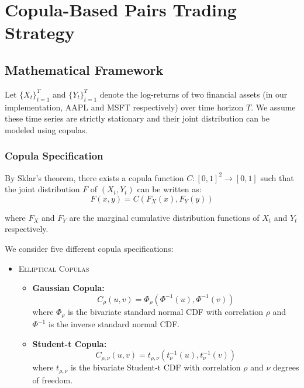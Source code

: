 \section{Copula-Based Pairs Trading Strategy}

\subsection{Mathematical Framework}

Let $\{X_t\}_{t=1}^T$ and $\{Y_t\}_{t=1}^T$ denote the log-returns of two financial assets (in our implementation, AAPL and MSFT respectively) over time horizon $T$. We assume these time series are strictly stationary and their joint distribution can be modeled using copulas.

\subsubsection{Copula Specification}

By Sklar's theorem, there exists a copula function $C: [0,1]^2 \rightarrow [0,1]$ such that the joint distribution $F$ of $(X_t, Y_t)$ can be written as:
\begin{equation*}
F(x,y) = C(F_X(x), F_Y(y))
\end{equation*}

where $F_X$ and $F_Y$ are the marginal cumulative distribution functions of $X_t$ and $Y_t$ respectively.

We consider five different copula specifications:

\begin{itemize}
\item \textsc{Elliptical Copulas}

\begin{itemize}
    \item \textbf{Gaussian Copula:}
\begin{equation*}
	C_{\rho}(u,v) = \Phi_{\rho}(\Phi^{-1}(u), \Phi^{-1}(v))
\end{equation*}
    where $\Phi_{\rho}$ is the bivariate standard normal CDF with correlation $\rho$ and $\Phi^{-1}$ is the inverse standard normal CDF.
    \item \textbf{Student-t Copula:}
\begin{equation*}
	C_{\rho,\nu}(u,v) = t_{\rho,\nu}(t_{\nu}^{-1}(u), t_{\nu}^{-1}(v))
\end{equation*}
    where $t_{\rho,\nu}$ is the bivariate Student-t CDF with correlation $\rho$ and $\nu$ degrees of freedom.
\end{itemize}
\end{itemize}

